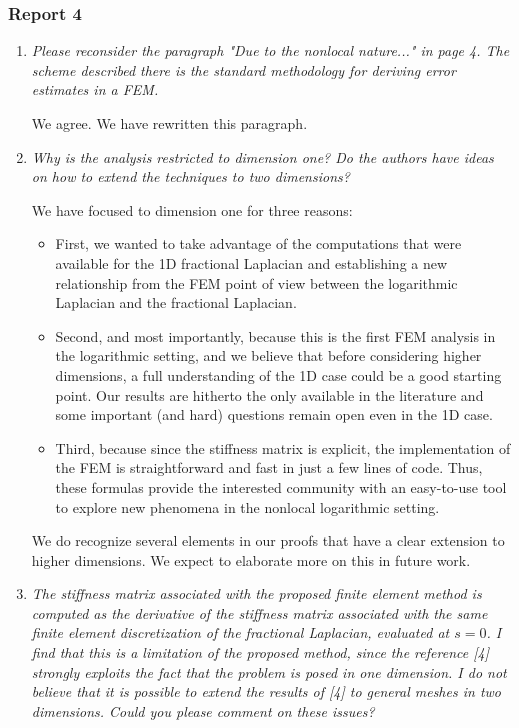 \documentclass[11 pt]{article}
\numberwithin{equation}{section}
\begin{document}
\newpage


\subsubsection*{Report 4}

\begin{enumerate}
 \item
\emph{
Please reconsider the paragraph "Due to the nonlocal nature..." in page 4. The scheme described there is the standard methodology for deriving error estimates in a FEM.
}

We agree.  We have rewritten this paragraph.

\item \emph{
 Why is the analysis restricted to dimension one? Do the authors have ideas on how to extend the techniques to two dimensions?
}

We have focused to dimension one for three reasons:
\begin{itemize}
 \item First, we wanted to take advantage of the computations that were available for the 1D fractional Laplacian and establishing a new relationship from the FEM point of view between the logarithmic Laplacian and the fractional Laplacian.
 \item  Second, and most importantly, because this is the first FEM analysis in the logarithmic setting, and we believe that before considering higher dimensions, a full understanding of the 1D case could be a good starting point.  Our results are hitherto the only available in the literature and some important (and hard) questions remain open even in the 1D case.
 \item Third, because since the stiffness matrix is explicit, the implementation of the FEM is straightforward and fast in just a few lines of code. Thus, these formulas provide the interested community with an easy-to-use tool to explore new phenomena in the nonlocal logarithmic setting.
\end{itemize}


We do recognize several elements in our proofs that have a clear extension to higher dimensions. We expect to elaborate more on this in future work.


\item \emph{
 The stiffness matrix associated with the proposed finite element method is computed as the derivative of the stiffness matrix associated with the same finite element discretization of the fractional Laplacian, evaluated at $s=0$. I find that this is a limitation of the proposed method, since the reference [4] strongly exploits the fact that the problem is posed in one dimension. I do not believe that it is possible to extend the results of [4] to general meshes in two dimensions. Could you please comment on these issues?
}



\end{enumerate}
\end{document}
